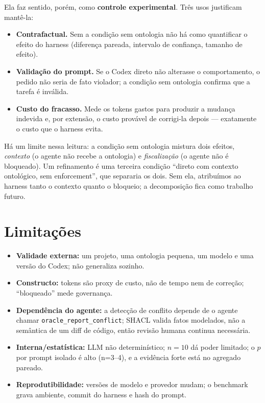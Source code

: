 \documentclass[11pt,a4paper]{article}
\begin{document}
Ela faz sentido, porém, como \textbf{controle experimental}. Três usos justificam mantê-la:
\begin{itemize}[leftmargin=1.4em]
\item \textbf{Contrafactual.} Sem a condição sem ontologia não há como quantificar o efeito do harness (diferença pareada, intervalo de confiança, tamanho de efeito).
\item \textbf{Validação do prompt.} Se o Codex direto não alterasse o comportamento, o pedido não seria de fato violador; a condição sem ontologia confirma que a tarefa é inválida.
\item \textbf{Custo do fracasso.} Mede os tokens gastos para produzir a mudança indevida e, por extensão, o custo provável de corrigi-la depois --- exatamente o custo que o harness evita.
\end{itemize}
Há um limite nessa leitura: a condição sem ontologia mistura dois efeitos, \emph{contexto} (o agente não recebe a ontologia) e \emph{fiscalização} (o agente não é bloqueado). Um refinamento é uma terceira condição ``direto com contexto ontológico, sem enforcement'', que separaria os dois. Sem ela, atribuímos ao harness tanto o contexto quanto o bloqueio; a decomposição fica como trabalho futuro.

\section{Limitações}
\begin{itemize}[leftmargin=1.4em]
\item \textbf{Validade externa:} um projeto, uma ontologia pequena, um modelo e uma versão do Codex; não generaliza sozinho.
\item \textbf{Constructo:} tokens são proxy de custo, não de tempo nem de correção; ``bloqueado'' mede governança.
\item \textbf{Dependência do agente:} a detecção de conflito depende de o agente chamar \texttt{oracle\_report\_conflict}; SHACL valida fatos modelados, não a semântica de um diff de código, então revisão humana continua necessária.
\item \textbf{Interna/estatística:} LLM não determinístico; $n=10$ dá poder limitado; o $p$ por prompt isolado é alto (n=3--4), e a evidência forte está no agregado pareado.
\item \textbf{Reprodutibilidade:} versões de modelo e provedor mudam; o benchmark grava ambiente, commit do harness e hash do prompt.
\end{itemize}
\end{document}
